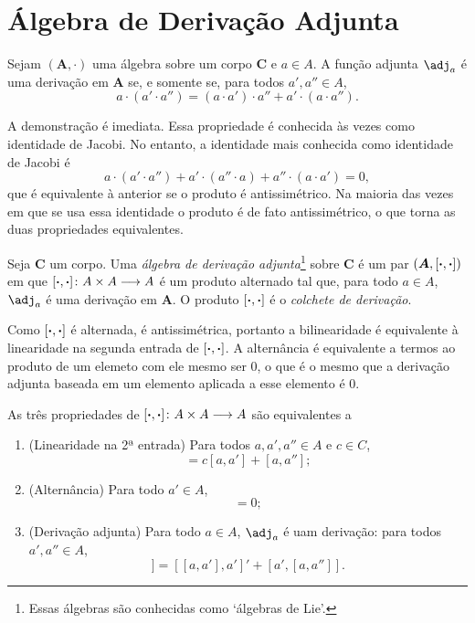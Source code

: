 \section{Álgebra de Derivação Adjunta}

\begin{prop}
Sejam $(\bm A,\cdot)$ uma álgebra sobre um corpo $\bm C$ e $a \in A$. A função adjunta $\adj_a$ é uma derivação em $\bm A$ se, e somente se, para todos $a',a'' \in A$,
	\begin{equation*}
	a \cdot (a' \cdot a'') = (a \cdot a') \cdot a'' + a' \cdot (a \cdot a'').
	\end{equation*}
\end{prop}

A demonstração é imediata. Essa propriedade é conhecida às vezes como identidade de Jacobi. No entanto, a identidade mais conhecida como identidade de Jacobi é
	\begin{equation*}
	a \cdot (a' \cdot a'') + a' \cdot (a'' \cdot a) + a'' \cdot (a \cdot a') = 0,
	\end{equation*}
que é equivalente à anterior se o produto é antissimétrico. Na maioria das vezes em que se usa essa identidade o produto é de fato antissimétrico, o que torna as duas propriedades equivalentes.

\begin{defi}
Seja $\bm C$ um corpo. Uma \emph{álgebra de derivação adjunta}\footnote{Essas álgebras são conhecidas como `álgebras de Lie'.} sobre $\bm C$ é um par $(\bm A,[\bm{\cdot},\bm{\cdot}])$ em que $[\bm{\cdot},\bm{\cdot}]\colon A \times A \longrightarrow A$ é um produto alternado tal que, para todo $a \in A$, $\adj_a$ é uma derivação em $\bm A$. O produto $[\bm{\cdot},\bm{\cdot}]$ é o \emph{colchete de derivação}.
\end{defi}

Como $[\bm{\cdot},\bm{\cdot}]$ é alternada, é antissimétrica, portanto a bilinearidade é equivalente à linearidade na segunda entrada de $[\bm{\cdot},\bm{\cdot}]$. A alternância é equivalente a termos ao produto de um elemeto com ele mesmo ser $0$, o que é o mesmo que a derivação adjunta baseada em um elemento aplicada a esse elemento é $0$.

As três propriedades de $[\bm{\cdot},\bm{\cdot}]\colon A \times A \longrightarrow A$ são equivalentes a
	\begin{enumerate}
	\item (Linearidade na 2ª entrada) Para todos $a,a',a'' \in A$ e $c \in C$,
		\begin{equation*}
		[a,ca'+a''] = c[a,a'] + [a,a''];
		\end{equation*}
	\item (Alternância) Para todo $a' \in A$,
		\begin{equation*}
		[a,a] = 0;
		\end{equation*}
	\item (Derivação adjunta) Para todo $a \in A$, $\adj_a$ é uam derivação: para todos $a',a'' \in A$,
		\begin{equation*}
		[a,[a',a'']] = [[a,a'],a']' + [a',[a,a'']].
		\end{equation*}
	\end{enumerate}

